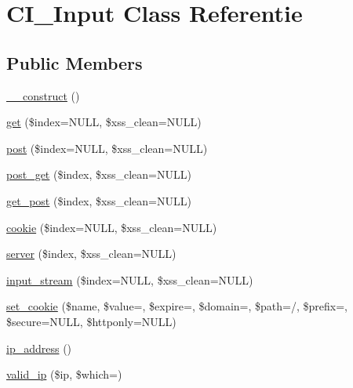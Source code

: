 \hypertarget{class_c_i___input}{}\section{C\+I\+\_\+\+Input Class Referentie}
\label{class_c_i___input}
\subsection*{Public Members}
\begin{DoxyCompactItemize}
\item 
\mbox{\hyperlink{class_c_i___input_a095c5d389db211932136b53f25f39685}{\+\_\+\+\_\+construct}} ()
\item 
\mbox{\hyperlink{class_c_i___input_a970536cd64a3d4457502140cce03fb05}{get}} (\$index=N\+U\+LL, \$xss\+\_\+clean=N\+U\+LL)
\item 
\mbox{\hyperlink{class_c_i___input_abe57ddea9c16f0d9194c82c700c0416f}{post}} (\$index=N\+U\+LL, \$xss\+\_\+clean=N\+U\+LL)
\item 
\mbox{\hyperlink{class_c_i___input_a3c554376c4a437c5363a143d1ca88ecc}{post\+\_\+get}} (\$index, \$xss\+\_\+clean=N\+U\+LL)
\item 
\mbox{\hyperlink{class_c_i___input_aaf7eba2dc5fda4e14ae063f66236821f}{get\+\_\+post}} (\$index, \$xss\+\_\+clean=N\+U\+LL)
\item 
\mbox{\hyperlink{class_c_i___input_a473ce915ac81faa466ca351dacae799d}{cookie}} (\$index=N\+U\+LL, \$xss\+\_\+clean=N\+U\+LL)
\item 
\mbox{\hyperlink{class_c_i___input_aab98211ca0db00061e8eb8b928f4fd90}{server}} (\$index, \$xss\+\_\+clean=N\+U\+LL)
\item 
\mbox{\hyperlink{class_c_i___input_a55235beafbbc257c5e511435a4d9ec81}{input\+\_\+stream}} (\$index=N\+U\+LL, \$xss\+\_\+clean=N\+U\+LL)
\item 
\mbox{\hyperlink{class_c_i___input_aa3601d205cabc35a3d1f56ed90024eda}{set\+\_\+cookie}} (\$name, \$value=\textquotesingle{}\textquotesingle{}, \$expire=\textquotesingle{}\textquotesingle{}, \$domain=\textquotesingle{}\textquotesingle{}, \$path=\textquotesingle{}/\textquotesingle{}, \$prefix=\textquotesingle{}\textquotesingle{}, \$secure=N\+U\+LL, \$httponly=N\+U\+LL)
\item 
\mbox{\hyperlink{class_c_i___input_aec2f772317b4fb79cc696412c2e455c3}{ip\+\_\+address}} ()
\item 
\mbox{\hyperlink{class_c_i___input_a10da42e1fde6cd5b335efcd2338c4ff8}{valid\+\_\+ip}} (\$ip, \$which=\textquotesingle{}\textquotesingle{})

\end{DoxyCompactItemize}
